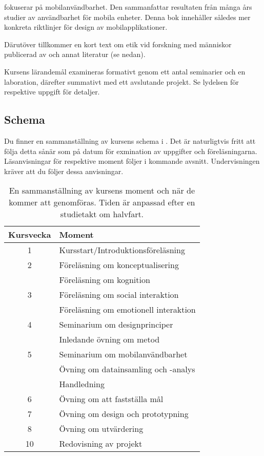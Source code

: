\documentclass[a4paper,logo]{miunart}
\begin{document}
 fokuserar på mobilanvändbarhet.
Den sammanfattar resultaten från många års studier av användbarhet för mobila 
enheter.
Denna bok innehåller således mer konkreta riktlinjer för design av 
mobilapplikationer.

Därutöver tillkommer en kort text om etik vid forskning med människor 
publicerad av \citet{VR2002fpi} och annat literatur (se nedan).

Kursens lärandemål examineras formativt genom ett antal seminarier och en 
laboration, därefter summativt med ett avslutande projekt.
Se lydelsen för respektive uppgift för detaljer.

\subsection{Schema}

Du finner en sammanställning av kursens schema i .
Det är naturligtvis fritt att följa detta sånär som på datum för exmination av 
uppgifter och föreläsningarna.
Läsanvisningar för respektive moment följer i kommande avsnitt.
Undervisningen kräver att du följer dessa anvisningar.

\begin{table}
  \centering
  \begin{tabular}{cp{10cm}}
    \toprule
    \textbf{Kursvecka} & \textbf{Moment} \\
    \toprule
    1   & Kursstart/Introduktionsföreläsning \\
    \midrule
    2
        & Föreläsning om konceptualisering \\
        & Föreläsning om kognition \\
    \midrule
    3
        & Föreläsning om social interaktion \\
        & Föreläsning om emotionell interaktion \\
    \midrule
    4
        & Seminarium om designprinciper \\
        & Inledande övning om metod \\
    \midrule
    5
        & Seminarium om mobilanvändbarhet \\
        & Övning om datainsamling och -analys \\
        & Handledning \\
    \midrule
    6
        & Övning om att fastställa mål \\
    \midrule
    7
        & Övning om design och prototypning \\
    \midrule
    8
        & Övning om utvärdering \\
    \midrule
    10
        & Redovisning av projekt \\
    \bottomrule
  \end{tabular}
  \caption{En sammanställning av kursens moment och när de kommer att 
    genomföras.
    Tiden är anpassad efter en studietakt om halvfart.
  }
  \label{tbl:schema}
\end{table}
\end{document}
